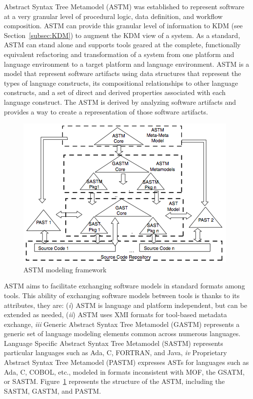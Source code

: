 Abstract Syntax Tree Metamodel (ASTM) was established to represent software at a very granular level of procedural logic, data definition, and workflow composition. ASTM can provide this granular level of information to KDM (see Section~\ref{subsec:KDM}) to augment the KDM view of a system. As a standard, ASTM can stand alone and supports tools geared at the complete, functionally equivalent refactoring and transformation of a system from one platform and language environment to a target platform and language environment. ASTM is a model that represent software artifacts using data structures that represent the types of language constructs, its compositional relationships to other language constructs, and a set of direct and derived properties associated with each language construct. The ASTM is derived by analyzing software artifacts and provides a way to create a representation of those software artifacts. 

\begin{figure}[!ht]
\centering
  \includegraphics[scale=0.56]{figuras/ASTM}
\caption{ASTM modeling framework}
\label{ASTM}
\end{figure}

ASTM aims to facilitate exchanging software models in standard formats among tools. This ability of exchanging software models between tools is thanks to its attributes, they are: (\textit{i}) ASTM is language and platform independent, but can be extended as needed, (\textit{ii}) ASTM uses XMI formats for tool-based metadata exchange, \textit{iii} Generic Abstract Syntax Tree Metamodel (GASTM) represents a generic set of language modeling elements common across numerous languages. Language Specific Abstract Syntax Tree Metamodel (SASTM) represents particular languages such as Ada, C, FORTRAN, and Java, \textit{iv} Proprietary Abstract Syntax Tree Metamodel (PASTM) expresses ASTs for languages such as Ada, C, COBOL, etc., modeled in formats inconsistent with MOF, the GSATM, or SASTM. Figure~\ref{ASTM} represents the structure of the ASTM, including the SASTM, GASTM, and PASTM.

